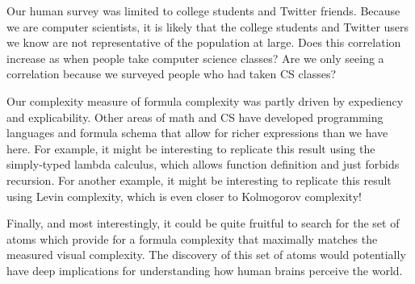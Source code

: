 \documentclass[11pt]{article}
\begin{document}
Our human survey was limited to college students and Twitter friends.  Because
we are computer scientists, it is likely that the college students and Twitter
users we know are not representative of the population at large.  Does this
correlation increase as when people take computer science classes?  Are we only
seeing a correlation because we surveyed people who had taken CS classes? 

Our complexity measure of formula complexity was partly driven by expediency
and explicability.  Other areas of math and CS have developed programming
languages and formula schema that allow for richer expressions than we have
here.  For example, it might be interesting to replicate this result using the
simply-typed lambda calculus, which allows function definition and just forbids
recursion.  For another example, it might be interesting to replicate this
result using Levin complexity, which is even closer to Kolmogorov complexity!

Finally, and most interestingly, it could be quite fruitful to search for the
set of atoms which provide for a formula complexity that maximally matches the
measured visual complexity.  The discovery of this set of atoms would
potentially have deep implications for understanding how human brains perceive
the world.

 
\end{document}
